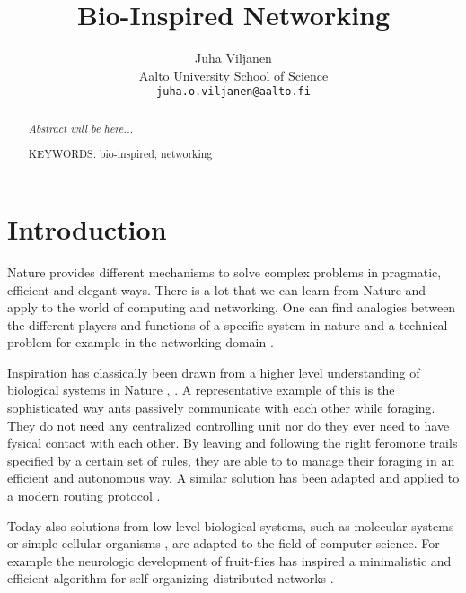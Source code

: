 \documentclass{IWORK2014}
\begin{document}

\title{Bio-Inspired Networking}

\author{Juha Viljanen\\
        Aalto University School of Science \\
	\texttt{juha.o.viljanen@aalto.fi}}
\maketitle


\begin{abstract}
\textit{Abstract will be here...}

\vspace{3mm}
\noindent KEYWORDS: bio-inspired, networking

\end{abstract}



\section{Introduction}

Nature provides different mechanisms to solve complex problems in pragmatic, efficient and elegant ways. There is a lot that we can learn from Nature and apply to the world of computing and networking. One can find analogies between the different players and functions of a specific system in nature and a technical problem for example in the networking domain \cite{dressler2010bio}.

Inspiration has classically been drawn from a higher level understanding of biological systems in Nature \cite{kroeker2011biology}, \cite{liu2012physarum}. A representative example of this is the sophisticated way ants passively communicate with each other while foraging. They do not need any centralized controlling unit nor do they ever need to have fysical contact with each other. By leaving and following the right feromone trails specified by a certain set of rules, they are able to to manage their foraging in an efficient and autonomous way. A similar solution has been adapted and applied to a modern routing protocol \cite{dressler2010bio}.

Today also solutions from low level biological systems, such as molecular systems \cite{kroeker2011biology} or simple cellular organisms \cite{liu2012physarum}, are adapted to the field of computer science. For example the neurologic development of fruit-flies has inspired a minimalistic and efficient algorithm for self-organizing distributed networks \cite{kroeker2011biology}.
\end{document}
